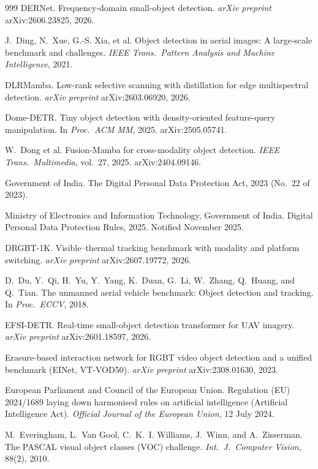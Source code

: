 \begin{thebibliography}{999}
DERNet. Frequency-domain small-object detection.
\textit{arXiv preprint} arXiv:2606.23825, 2026.

J.~Ding, N.~Xue, G.-S. Xia, et al.
Object detection in aerial images: A large-scale benchmark and challenges.
\textit{IEEE Trans.\ Pattern Analysis and Machine Intelligence}, 2021.

DLRMamba. Low-rank selective scanning with distillation for edge multispectral
detection. \textit{arXiv preprint} arXiv:2603.06920, 2026.

Dome-DETR. Tiny object detection with density-oriented feature-query
manipulation. In \textit{Proc.\ ACM MM}, 2025. arXiv:2505.05741.

W.~Dong et al.
Fusion-Mamba for cross-modality object detection.
\textit{IEEE Trans.\ Multimedia}, vol.~27, 2025. arXiv:2404.09146.

Government of India.
The Digital Personal Data Protection Act, 2023 (No.~22 of 2023).

Ministry of Electronics and Information Technology, Government of India.
Digital Personal Data Protection Rules, 2025. Notified November 2025.

DRGBT-1K. Visible--thermal tracking benchmark with modality and platform
switching. \textit{arXiv preprint} arXiv:2607.19772, 2026.

D.~Du, Y.~Qi, H.~Yu, Y.~Yang, K.~Duan, G.~Li, W.~Zhang, Q.~Huang, and Q.~Tian.
The unmanned aerial vehicle benchmark: Object detection and tracking.
In \textit{Proc.\ ECCV}, 2018.

EFSI-DETR. Real-time small-object detection transformer for UAV imagery.
\textit{arXiv preprint} arXiv:2601.18597, 2026.

Erasure-based interaction network for RGBT video object detection and a
unified benchmark (EINet, VT-VOD50).
\textit{arXiv preprint} arXiv:2308.01630, 2023.

European Parliament and Council of the European Union.
Regulation (EU) 2024/1689 laying down harmonised rules on artificial
intelligence (Artificial Intelligence Act).
\textit{Official Journal of the European Union}, 12 July 2024.

M.~Everingham, L.~Van Gool, C.~K.~I. Williams, J.~Winn, and A.~Zisserman.
The PASCAL visual object classes (VOC) challenge.
\textit{Int.\ J.\ Computer Vision}, 88(2), 2010.


\end{thebibliography}
